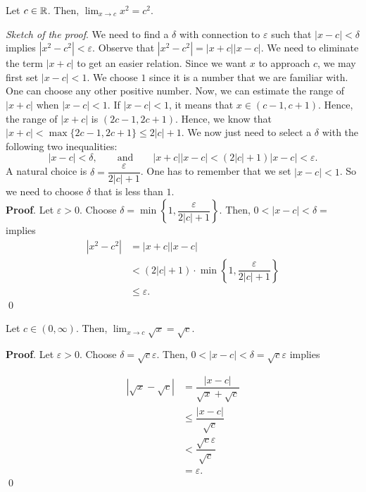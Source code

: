 \documentclass[11pt]{book}
\begin{document}
\begin{proposition}
    Let $c\in\mathbb{R}$. Then, $\displaystyle\lim_{x\to c}x^2=c^2.$
\end{proposition}
\textit{Sketch of the proof}. We need to find a $\delta$ with connection to $\varepsilon$ such that $|x-c|<\delta$ implies $|x^2-c^2|<\varepsilon$. Observe that $|x^2-c^2|=|x+c||x-c|$. We need to eliminate the term $|x+c|$ to get an easier relation. Since we want $x$ to approach $c$, we may first set $|x-c|<1$. We choose $1$ since it is a number that we are familiar with. One can choose any other positive number. Now, we can estimate the range of $|x+c|$ when $|x-c|<1$. If $|x-c|<1$, it means that $x\in(c-1, c+1)$. Hence, the range of $|x+c|$ is $(2c-1, 2c+1)$. Hence, we know that $|x+c|<\max\{2c-1, 2c+1\}\leq 2|c|+1$. We now just need to select a $\delta$ with the following two inequalities: 
\begin{equation*}
    |x-c|<\delta, \qquad\text{and}\qquad |x+c||x-c|<(2|c|+1)|x-c|<\varepsilon.
\end{equation*}
A natural choice is $\delta=\dfrac{\varepsilon}{2|c|+1}$. One has to remember that we set $|x-c|<1$. So we need to choose $\delta$ that is less than $1$.\\\setlength{\delimitershortfall}{0pt}
\textbf{Proof}. Let $\varepsilon>0$. Choose $\delta=\min\left\{1, \dfrac{\varepsilon}{2|c|+1}\right\}$. Then, $0<|x-c|<\delta=$ implies \begin{align*}
    |x^2-c^2|&=|x+c||x-c|\\
    &<(2|c|+1)\cdot\min\left\{1, \dfrac{\varepsilon}{2|c|+1}\right\}\\
    &\leq\varepsilon.
\end{align*} \qed

\setlength{\delimitershortfall}{13.5pt}

\begin{proposition}
    Let $c\in(0, \infty)$. Then, $\displaystyle\lim_{x\to c}\sqrt{x}=\sqrt{c}.$
\end{proposition}
\textbf{Proof}. Let $\varepsilon>0$. Choose $\delta=\sqrt{c}\varepsilon$. Then, $0<|x-c|<\delta=\sqrt{c}\varepsilon$ implies

\begin{align*}
    |\sqrt{x}-\sqrt{c}|&=\dfrac{|x-c|}{\sqrt{x}+\sqrt{c}}\\
    &\leq\dfrac{|x-c|}{\sqrt{c}}\\
    &<\dfrac{\sqrt{c}\varepsilon}{\sqrt{c}}\\
    &=\varepsilon.
\end{align*} \qed
\end{document}
